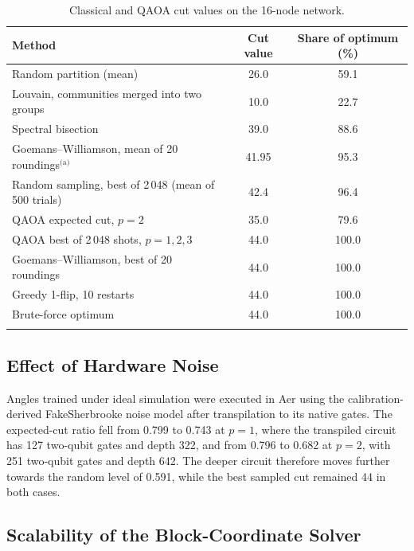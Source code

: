 \documentclass[pdflatex,sn-mathphys-num]{sn-jnl}
\theoremstyle{thmstyleone}
\theoremstyle{thmstyletwo}
\theoremstyle{thmstylethree}
\begin{document}
\begin{table}[h]
\caption{Classical and QAOA cut values on the 16-node network.}\label{tab:comparison}
\begin{tabular*}{\textwidth}{@{\extracolsep\fill}lcc}
\toprule
Method & Cut value & Share of optimum (\%) \\
\midrule
Random partition (mean) & 26.0 & 59.1 \\
Louvain, communities merged into two groups & 10.0 & 22.7 \\
Spectral bisection & 39.0 & 88.6 \\
Goemans--Williamson, mean of 20 roundings$^{\text{(a)}}$ & 41.95 & 95.3 \\
Random sampling, best of 2\,048 (mean of 500 trials) & 42.4 & 96.4 \\
QAOA expected cut, $p=2$ & 35.0 & 79.6 \\
QAOA best of 2\,048 shots, $p=1,2,3$ & 44.0 & 100.0 \\
Goemans--Williamson, best of 20 roundings & 44.0 & 100.0 \\
Greedy 1-flip, 10 restarts & 44.0 & 100.0 \\
Brute-force optimum & 44.0 & 100.0 \\
\botrule
\end{tabular*}
\end{table}

\subsection{Effect of Hardware Noise}\label{sec:noise}

Angles trained under ideal simulation were executed in Aer using the calibration-derived FakeSherbrooke noise model after transpilation to its native gates. The expected-cut ratio fell from 0.799 to 0.743 at $p=1$, where the transpiled circuit has 127 two-qubit gates and depth 322, and from 0.796 to 0.682 at $p=2$, with 251 two-qubit gates and depth 642. The deeper circuit therefore moves further towards the random level of 0.591, while the best sampled cut remained 44 in both cases.

\subsection{Scalability of the Block-Coordinate Solver}\label{sec:scalability}
\end{document}
